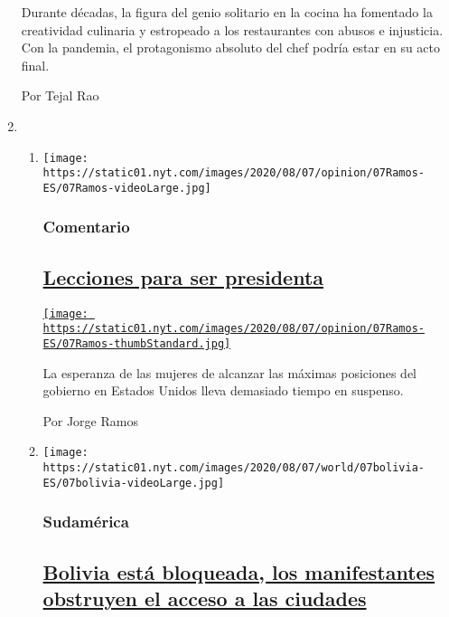 \begin{enumerate}
  Durante décadas, la figura del genio solitario en la cocina ha
  fomentado la creatividad culinaria y estropeado a los restaurantes con
  abusos e injusticia. Con la pandemia, el protagonismo absoluto del
  chef podría estar en su acto final.

  Por Tejal Rao
\item
  \begin{enumerate}
  \def\labelenumii{\arabic{enumii}.}
  \item
    \texttt{[image: https://static01.nyt.com/images/2020/08/07/opinion/07Ramos-ES/07Ramos-videoLarge.jpg]}

    \hypertarget{comentario}{%
    \subsubsection{Comentario}\label{comentario}}

    \hypertarget{lecciones-para-ser-presidenta}{%
    \subsection{\texorpdfstring{\href{/es/2020/08/07/espanol/opinion/presidenta-estados-unidos.html}{Lecciones
    para ser
    presidenta}}{Lecciones para ser presidenta}}\label{lecciones-para-ser-presidenta}}

    \href{/es/2020/08/07/espanol/opinion/presidenta-estados-unidos.html}{\texttt{[image: https://static01.nyt.com/images/2020/08/07/opinion/07Ramos-ES/07Ramos-thumbStandard.jpg]}}

    La esperanza de las mujeres de alcanzar las máximas posiciones del
    gobierno en Estados Unidos lleva demasiado tiempo en suspenso.

    Por Jorge Ramos
  \item
    \texttt{[image: https://static01.nyt.com/images/2020/08/07/world/07bolivia-ES/07bolivia-videoLarge.jpg]}

    \hypertarget{sudamuxe9rica}{%
    \subsubsection{Sudamérica}\label{sudamuxe9rica}}

    \hypertarget{bolivia-estuxe1-bloqueada-los-manifestantes-obstruyen-el-acceso-a-las-ciudades}{%
    \subsection{\texorpdfstring{\href{/es/2020/08/07/espanol/america-latina/bloqueos-bolivia.html}{Bolivia
    está bloqueada, los manifestantes obstruyen el acceso a las
    ciudades}}{Bolivia está bloqueada, los manifestantes obstruyen el acceso a las ciudades}}\label{bolivia-estuxe1-bloqueada-los-manifestantes-obstruyen-el-acceso-a-las-ciudades}}


\end{enumerate}
\end{enumerate}
